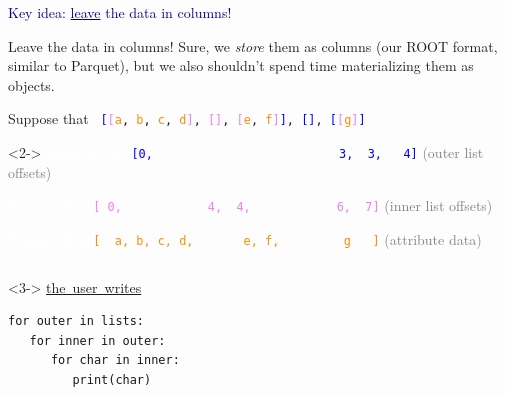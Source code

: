 \documentclass[aspectratio=169]{beamer}
\begin{document}
\begin{frame}{}
\huge
\begin{center}
\textcolor{darkblue}{Key idea: \underline{leave} the data in columns!}
\end{center}
\end{frame}

\begin{frame}[fragile]{Leave the data in columns!}
\vspace{0.5 cm}
Sure, we {\it store} them as columns (our ROOT format, similar to Parquet), but we also shouldn't spend time materializing them as objects.

\vspace{0.25 cm}
Suppose that {\tt\small \textcolor{white}{[}\textcolor{blue}{[}\textcolor{violet}{[}\textcolor{darkorange}{a}, \textcolor{darkorange}{b}, \textcolor{darkorange}{c}, \textcolor{darkorange}{d}\textcolor{violet}{]}, \textcolor{violet}{[]}, \textcolor{violet}{[}\textcolor{darkorange}{e}, \textcolor{darkorange}{f}\textcolor{violet}{]}\textcolor{blue}{]}, \textcolor{blue}{[]}, \textcolor{blue}{[}\textcolor{violet}{[}\textcolor{darkorange}{g}\textcolor{violet}{]}\textcolor{blue}{]}\ \textcolor{white}{]}} 

\begin{uncoverenv}<2->
\textcolor{white}{Suppose that}
             {\tt\small \textcolor{blue}{[0,\ \ \ \ \ \ \ \ \ \ \ \ \ \ \ \ \ \ \ \ \ \ \ \ \ \ 3,\ \ 3,\ \ \ 4]}} \textcolor{gray}{(outer list offsets)}

\textcolor{white}{Suppose that}
             {\tt\small \textcolor{violet}{[\ 0,\ \ \ \ \ \ \ \ \ \ \ \ 4,\ \ 4,\ \ \ \ \ \ \ \ \ \ \ \ 6,\ \ 7]}} \textcolor{gray}{(inner list offsets)}

\textcolor{white}{Suppose that}
             {\tt\small \textcolor{darkorange}{[\ \ a,\ b,\ c,\ d,\ \ \ \ \ \ \ e,\ f,\ \ \ \ \ \ \ \ \ g\ \ \ ]}} \textcolor{gray}{(attribute data)}
\end{uncoverenv}

\vspace{0.5 cm}
\begin{columns}[t]
\begin{uncoverenv}<3->
\mbox{\hspace{-0.1 cm}\underline{the user writes}}

\vspace{-0.25 cm}
\small
\begin{verbatim}
for outer in lists:
   for inner in outer:
      for char in inner:
         print(char)
\end{verbatim}
\end{uncoverenv}


\end{columns}
\end{frame}
\end{document}
